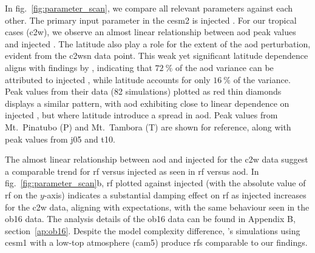 \documentclass{ametsocV6.1}
\newcommand{\iso}[1][i]{{#1}njected \ce{SO2}}
\begin{document}
In fig.~\ref{fig:parameter_scan}, we compare all relevant parameters against each other.
The primary input parameter in the \gls{cesm2} is \iso{}. For our tropical cases
(\gls{c2w}), we observe an almost linear relationship between \gls{aod} peak values and
\iso{}. The latitude also play a role for the extent of the \gls{aod} perturbation,
evident from the \gls{c2wsn} data point. This weak yet significant latitude dependence
aligns with findings by \citet{marshall2019}, indicating that \(\SI{72}{\percent}\) of
the \gls{aod} variance can be attributed to \iso{}, while latitude accounts for only
\(\SI{16}{\percent}\) of the variance. Peak values from their data (82 simulations)
plotted as red thin diamonds displays a similar pattern, with \gls{aod} exhibiting close
to linear dependence on \iso{}, but where latitude introduce a spread in \gls{aod}. Peak
values from Mt.\ Pinatubo (P) and Mt.\ Tambora (T) are shown for reference, along with
peak values from \gls{j05} and \gls{t10}.

The almost linear relationship between \gls{aod} and \iso{} for the \gls{c2w} data
suggest a comparable trend for \gls{rf} versus \iso{} as seen in \gls{rf} versus
\gls{aod}. In fig.~\ref{fig:parameter_scan}b, \gls{rf} plotted against \iso{} (with the
absolute value of \gls{rf} on the \(y\)-axis) indicates a substantial damping effect on
\gls{rf} as \iso{} increases for the \gls{c2w} data, aligning with expectations, with
the same behaviour seen in the \gls{ob16} data. The analysis details of the \gls{ob16}
data can be found in Appendix B, section~\ref{ap:ob16}. Despite the model complexity
difference, \citet{ottobliesner2016}'s simulations using \gls{cesm1} with a low-top
atmosphere (\gls{cam5}) produce \glspl{rf} comparable to our findings.
\end{document}
